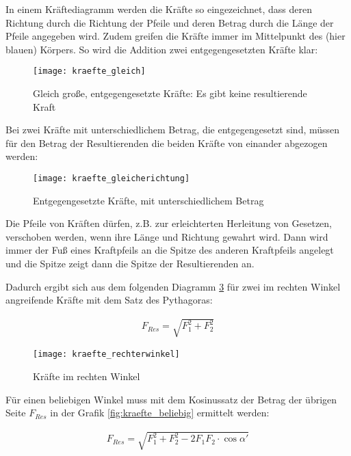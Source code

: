 In einem Kräftediagramm werden die Kräfte so eingezeichnet, dass deren Richtung durch die Richtung der Pfeile und deren Betrag durch die Länge der Pfeile angegeben wird. Zudem greifen die Kräfte immer im Mittelpunkt des (hier blauen) Körpers. So wird die Addition zwei entgegengesetzten Kräfte klar:

\begin{figure}[h!]
	\centering
	\texttt{[image: kraefte\_gleich]}
	\caption{Gleich große, entgegengesetzte Kräfte: Es gibt keine resultierende Kraft}
	\label{fig:kraefte_gleich}
\end{figure}

\noindent Bei zwei Kräfte mit unterschiedlichem Betrag, die entgegengesetzt sind, müssen für den Betrag der Resultierenden die beiden Kräfte von einander abgezogen werden:

\begin{figure}[h!]
	\centering
	\texttt{[image: kraefte\_gleicherichtung]}
	\caption{Entgegengesetzte Kräfte, mit unterschiedlichem Betrag}
	\label{fig:kraefte_gleicherichtung}
\end{figure}

\noindent Die Pfeile von Kräften dürfen, z.B. zur erleichterten Herleitung von Gesetzen, verschoben werden, wenn ihre Länge und Richtung gewahrt wird. Dann wird immer der Fuß eines Kraftpfeils an die Spitze des anderen Kraftpfeils angelegt und die Spitze zeigt dann die Spitze der Resultierenden an.

Dadurch ergibt sich aus dem folgenden Diagramm \ref{fig:kraefte_rechterwinkel} für zwei im rechten Winkel angreifende Kräfte mit dem Satz des Pythagoras:

\begin{align}
	F_{Res} = \sqrt{F_1^2 + F_2^2}
\end{align}

\begin{figure}[h!]
	\centering
	\texttt{[image: kraefte\_rechterwinkel]}
	\caption{Kräfte im rechten Winkel}
	\label{fig:kraefte_rechterwinkel}
\end{figure}

\noindent Für einen beliebigen Winkel muss mit dem Kosinussatz der Betrag der übrigen Seite $F_{Res}$ in der Grafik \ref{fig:kraefte_beliebig} ermittelt werden:

\begin{align}
	F_{Res} = \sqrt{F_1^2 + F_2^2 - 2F_1 F_2 \cdot \cos{\alpha '}}
\end{align}

